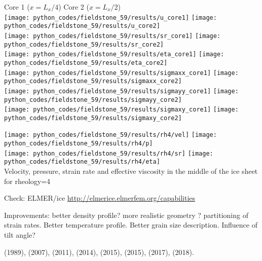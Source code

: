 \begin{center}
Core 1 ($x=L_x/4$) \hspace{5cm}  Core 2 ($x=L_x/2$)  \\
\texttt{[image: python\_codes/fieldstone\_59/results/u\_core1]}
\texttt{[image: python\_codes/fieldstone\_59/results/u\_core2]}\\
\texttt{[image: python\_codes/fieldstone\_59/results/sr\_core1]}
\texttt{[image: python\_codes/fieldstone\_59/results/sr\_core2]}\\
\texttt{[image: python\_codes/fieldstone\_59/results/eta\_core1]}
\texttt{[image: python\_codes/fieldstone\_59/results/eta\_core2]}\\
\texttt{[image: python\_codes/fieldstone\_59/results/sigmaxx\_core1]}
\texttt{[image: python\_codes/fieldstone\_59/results/sigmaxx\_core2]}\\
\texttt{[image: python\_codes/fieldstone\_59/results/sigmayy\_core1]}
\texttt{[image: python\_codes/fieldstone\_59/results/sigmayy\_core2]}\\
\texttt{[image: python\_codes/fieldstone\_59/results/sigmaxy\_core1]}
\texttt{[image: python\_codes/fieldstone\_59/results/sigmaxy\_core2]}
\end{center}


\begin{center}
\texttt{[image: python\_codes/fieldstone\_59/results/rh4/vel]}
\texttt{[image: python\_codes/fieldstone\_59/results/rh4/p]}\\
\texttt{[image: python\_codes/fieldstone\_59/results/rh4/sr]}
\texttt{[image: python\_codes/fieldstone\_59/results/rh4/eta]}\\
{\captionfont Velocity, pressure, strain rate and effective viscosity in the middle of the ice sheet
for rheology=4}
\end{center}



Check: ELMER/ice \url{http://elmerice.elmerfem.org/capabilities}

Improvements: better density profile? more realistic geometry ? 
partitioning of strain rates. Better temperature profile. 
Better grain size description. Influence of tilt angle? 

\vspace{1cm}

\Literature 
\textcite{buja89} (1989),
\textcite{zwgg07} (2007),
\textcite{zhjg11} (2011),
\textcite{lejx14} (2014),
\textcite{issg15} (2015),
\textcite{yash15} (2015),
\textcite{gors17} (2017),
\textcite{heah18} (2018).



